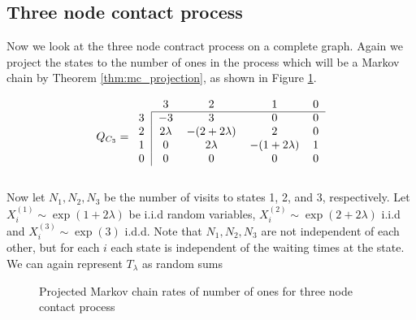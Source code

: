 \documentclass{article}
\theoremstyle{plain}
\theoremstyle{definition}
\theoremstyle{remark}
\numberwithin{equation}{section}
\begin{document}
\subsection{Three node contact process}
Now we look at the three node contract process on a complete graph.
Again we project the states to the number of ones in the process which will be a Markov chain by Theorem \ref{thm:mc_projection}, as shown in Figure \ref{fig:mc_three_contact}.

\begin{equation}
Q_{C_3} = \begin{blockarray}{ccccc}
    & 3 & 2 & 1 & 0\\
    \begin{block}{c|cccc}
    \cline{2-5}
        3 & -3 & 3 & 0 & 0 \\
        2 & 2\lambda & -(2 + 2 \lambda) &
        2 & 0\\
        1 & 0 & 2\lambda & -(1 + 2\lambda) & 1\\
    0 & 0 & 0 & 0 & 0\\
    \end{block}
\end{blockarray}
\end{equation}

Now let $N_1, N_2, N_3$ be the number of visits to states 1, 2, and 3, respectively.
Let $X_i^{(1)} \sim \exp(1 + 2\lambda)$ be i.i.d random variables, $X_i^{(2)} \sim \exp(2 + 2\lambda)$ i.i.d and $X_i^{(3)} \sim \exp(3)$ i.d.d.
Note that $N_1, N_2, N_3$ are not independent of each other, but for each $i$ each state is independent of the waiting times at the state.
We can again represent $T_\lambda$ as random sums

\begin{figure}
    \centering
    \caption{Projected Markov chain rates of number of ones for three node contact process}
    \label{fig:mc_three_contact}
\end{figure}
\end{document}
